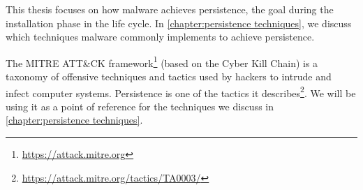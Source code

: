 This thesis focuses on how malware achieves persistence, the goal during the installation phase in the life cycle. In \autoref{chapter:persistence techniques}, we discuss which techniques malware commonly implements to achieve persistence.

\medskip

The MITRE ATT\&CK framework\footnote{\tiny \url{https://attack.mitre.org}} (based on the Cyber Kill Chain) is a taxonomy of offensive techniques and tactics used by hackers to intrude and infect computer systems. Persistence is one of the tactics it describes\footnote{\tiny \url{https://attack.mitre.org/tactics/TA0003/}}. We will be using it as a point of reference for the techniques we discuss in \autoref{chapter:persistence techniques}.



